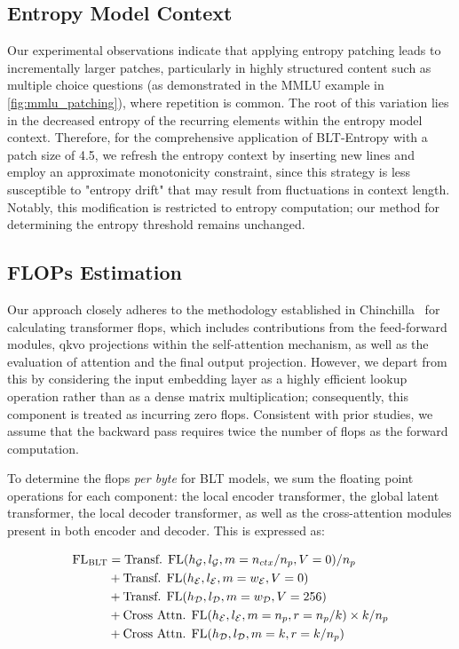 \subsection{Entropy Model Context}
\label{section:entropy-context}
Our experimental observations indicate that applying entropy patching leads to incrementally larger patches, particularly in highly structured content such as multiple choice questions (as demonstrated in the MMLU example in \autoref{fig:mmlu_patching}), where repetition is common. The root of this variation lies in the decreased entropy of the recurring elements within the entropy model context. Therefore, for the comprehensive application of {\textsc BLT}-Entropy with a patch size of 4.5, we refresh the entropy context by inserting new lines and employ an approximate monotonicity constraint, since this strategy is less susceptible to "entropy drift" that may result from fluctuations in context length. Notably, this modification is restricted to entropy computation; our method for determining the entropy threshold remains unchanged.

\subsection{FLOPs Estimation} 
\label{section:flops}

Our approach closely adheres to the methodology established in Chinchilla~\citep{hoffmann2022training} for calculating transformer flops, which includes contributions from the feed-forward modules, qkvo projections within the self-attention mechanism, as well as the evaluation of attention and the final output projection. However, we depart from this by considering the input embedding layer as a highly efficient lookup operation rather than as a dense matrix multiplication; consequently, this component is treated as incurring zero flops. Consistent with prior studies, we assume that the backward pass requires twice the number of flops as the forward computation.

To determine the flops \textit{per byte} for {\textsc BLT} models, we sum the floating point operations for each component: the local encoder transformer, the global latent transformer, the local decoder transformer, as well as the cross-attention modules present in both encoder and decoder. This is expressed as:

\begin{align}
    \text{FL}_{\text{{\textsc BLT}}} &= \text{Transf. FL}(h_{\mathcal{G}}, l_{\mathcal{G}}, m=n_{ctx}/n_p,V=0) / n_p\\
   &+\text{Transf. FL}(h_{\mathcal{E}}, l_{\mathcal{E}}, m=w_{\mathcal{E}}, V=0) \\
   &+ \text{Transf. FL}(h_{\mathcal{D}}, l_{\mathcal{D}}, m=w_{\mathcal{D}}, V=256) \\ 
    &+ \text{Cross Attn. FL}(h_{\mathcal{E}}, l_{\mathcal{E}}, m=n_p, r=n_p/k) \times k/n_p \\ 
   &+ \text{Cross Attn. FL}(h_{\mathcal{D}}, l_{\mathcal{D}}, m=k, r=k/n_p) 
\end{align}

